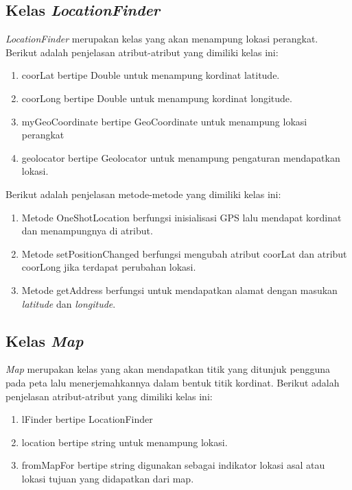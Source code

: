 \subsection{Kelas \textit{LocationFinder}}
\label{lab:Kelas LocationFinder}
\hspace{0.5cm} \textit{LocationFinder} merupakan kelas yang akan menampung lokasi perangkat. Berikut adalah penjelasan atribut-atribut yang dimiliki kelas ini:
\begin{enumerate}
	\item coorLat bertipe Double untuk menampung kordinat latitude.
	\item coorLong bertipe Double untuk menampung kordinat longitude.
	\item myGeoCoordinate bertipe GeoCoordinate untuk menampung lokasi perangkat
	\item geolocator bertipe Geolocator untuk menampung pengaturan mendapatkan lokasi.
\end{enumerate}

Berikut adalah penjelasan metode-metode yang dimiliki kelas ini:
\begin{enumerate}
	\item Metode OneShotLocation berfungsi inisialisasi GPS lalu mendapat kordinat dan menampungnya di atribut.
	\item Metode setPositionChanged berfungsi mengubah atribut coorLat dan atribut coorLong jika terdapat perubahan lokasi.
	\item Metode getAddress berfungsi untuk mendapatkan alamat dengan masukan \textit{latitude} dan \textit{longitude}.
\end{enumerate}

\subsection{Kelas \textit{Map}}
\label{lab:Kelas Map}
\hspace{0.5cm} \textit{Map} merupakan kelas yang akan mendapatkan titik yang ditunjuk pengguna pada peta lalu menerjemahkannya dalam bentuk titik kordinat. Berikut adalah penjelasan atribut-atribut yang dimiliki kelas ini:
\begin{enumerate}
	\item lFinder bertipe LocationFinder 
	\item location bertipe string untuk menampung lokasi.
	\item fromMapFor bertipe string digunakan sebagai indikator lokasi asal atau lokasi tujuan yang didapatkan dari map.
\end{enumerate}

